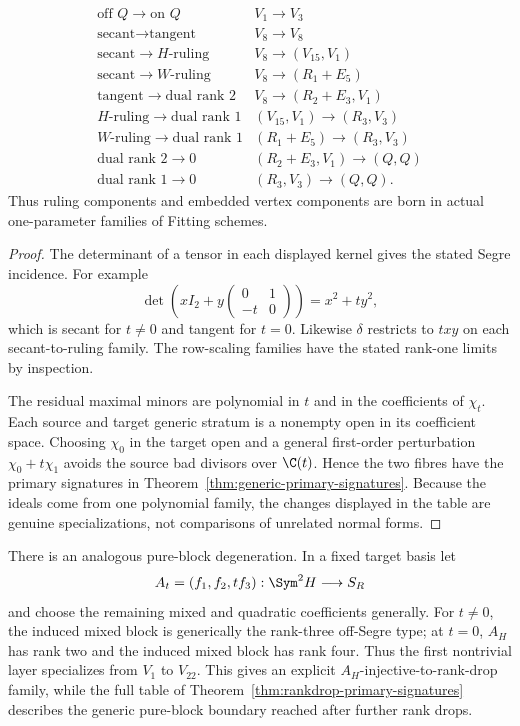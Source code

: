 \begin{theorem}
\[\begin{array}{l|l}
\text{off }Q\to\text{on }Q&V_1\to V_3\\
\text{secant}\to\text{tangent}&V_8\to V_8\\
\text{secant}\to H\text{-ruling}&V_8\to(V_{15},V_1)\\
\text{secant}\to W\text{-ruling}&V_8\to(R_1+E_5)\\
\text{tangent}\to\text{dual rank }2&V_8\to(R_2+E_3,V_1)\\
H\text{-ruling}\to\text{dual rank }1&(V_{15},V_1)\to(R_3,V_3)\\
W\text{-ruling}\to\text{dual rank }1&(R_1+E_5)\to(R_3,V_3)\\
\text{dual rank }2\to0&(R_2+E_3,V_1)\to(Q,Q)\\
\text{dual rank }1\to0&(R_3,V_3)\to(Q,Q).
\end{array}
\]
Thus ruling components and embedded vertex components are born in
actual one-parameter families of Fitting schemes.
\end{theorem}

\begin{proof}
The determinant of a tensor in each displayed kernel gives the stated
Segre incidence.  For example
\[
 \det\left(xI_2+y\begin{pmatrix}0&1\\-t&0\end{pmatrix}\right)
 =x^2+t y^2,
\]
which is secant for \(t\ne0\) and tangent for \(t=0\).  Likewise
\(\delta\) restricts to \(txy\) on each secant-to-ruling family.
The row-scaling families have the stated rank-one limits by inspection.

The residual maximal minors are polynomial in \(t\) and in the
coefficients of \(\chi_t\).  Each source and target generic stratum
is a nonempty open in its coefficient space.  Choosing
\(\chi_0\) in the target open and a general first-order perturbation
\(\chi_0+t\chi_1\) avoids the source bad divisors over
\(\C(t)\).  Hence the two fibres have the primary signatures in
Theorem~\ref{thm:generic-primary-signatures}.  Because the ideals
come from one polynomial family, the changes displayed in the table
are genuine specializations, not comparisons of unrelated normal
forms.
\end{proof}

There is an analogous pure-block degeneration.  In a fixed target
basis let
\[
 A_t=(f_1,f_2,t f_3):\Sym^2H\longrightarrow S_R
\]
and choose the remaining mixed and quadratic coefficients generally.
For \(t\ne0\), the induced mixed block is generically the rank-three
off-Segre type; at \(t=0\), \(A_H\) has rank two and the induced
mixed block has rank four.  Thus the first nontrivial layer specializes
from \(V_1\) to \(V_{22}\).  This gives an explicit
\(A_H\)-injective-to-rank-drop family, while the full table of
Theorem~\ref{thm:rankdrop-primary-signatures} describes the generic
pure-block boundary reached after further rank drops.
